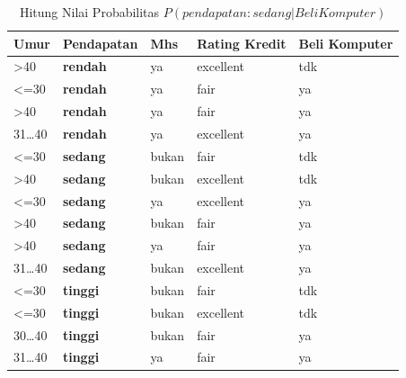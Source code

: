 \begin{enumerate}
\begin{table}[!ht]
\centering
\caption{Hitung Nilai Probabilitas $P(pendapatan :sedang|Beli Komputer)$ }
\label{prob2}
\begin{tabular}{|l|l|l|l|l|}
\hline
Umur             & \textbf{Pendapatan} & Mhs   & Rating Kredit & Beli Komputer \\ \hline
\textgreater{}40 & \textbf{rendah}     & ya    & excellent     & tdk           \\ \hline
\textless{}=30   & \textbf{rendah}     & ya    & fair          & ya            \\ \hline
\textgreater{}40 & \textbf{rendah}     & ya    & fair          & ya            \\ \hline
31…40            & \textbf{rendah}     & ya    & excellent     & ya            \\ \hline
\textless{}=30   & \textbf{sedang}     & bukan & fair          & tdk           \\ \hline
\textgreater{}40 & \textbf{sedang}     & bukan & excellent     & tdk           \\ \hline
\textless{}=30   & \textbf{sedang}     & ya    & excellent     & ya            \\ \hline
\textgreater{}40 & \textbf{sedang}     & bukan & fair          & ya            \\ \hline
\textgreater{}40 & \textbf{sedang}     & ya    & fair          & ya            \\ \hline
31…40            & \textbf{sedang}     & bukan & excellent     & ya            \\ \hline
\textless{}=30   & \textbf{tinggi}     & bukan & fair          & tdk           \\ \hline
\textless{}=30   & \textbf{tinggi}     & bukan & excellent     & tdk           \\ \hline
30…40            & \textbf{tinggi}     & bukan & fair          & ya            \\ \hline
31…40            & \textbf{tinggi}     & ya    & fair          & ya            \\ \hline
\end{tabular}
\end{table}



\end{enumerate}
